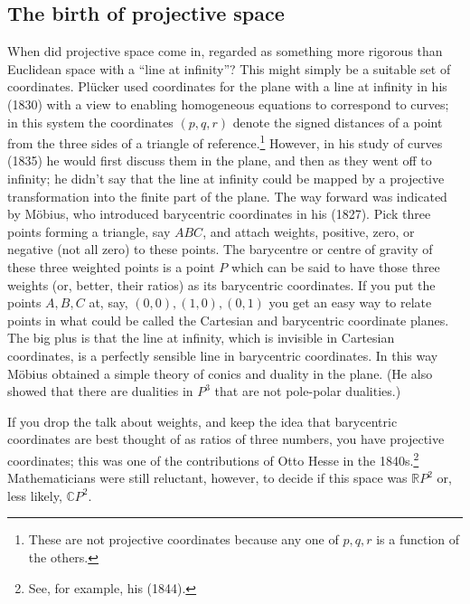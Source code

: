 \documentclass[11pt]{article}
\newcommand{\R}{\mathbb{R}}
\newcommand{\C}{\mathbb{C}}
\begin{document}
\subsection{The birth of projective space}
When did projective space come in, regarded as something more rigorous than Euclidean space with a ``line at infinity''? This might simply be a suitable set of coordinates. Pl\"ucker used coordinates for the plane with a line at infinity in his (1830) with a view to enabling homogeneous equations to correspond to curves; in this system the coordinates $(p, q, r)$ denote the signed distances of a point from the three sides of a triangle of reference.\footnote{These are not projective coordinates because any one of $p, q, r$ is a function of the others.} However, in his study of curves (1835) he would first discuss them in  the plane, and then as they went off to infinity; he didn't say that the line at infinity could be mapped by a projective transformation into the finite part of the plane.  The way forward was indicated by M\"obius, who introduced barycentric coordinates in his (1827). Pick three points forming a triangle, say $ABC$, and attach weights, positive, zero, or negative (not all zero) to these points. The barycentre or centre of gravity of these three weighted points is a point $P$ which can be said to have those three weights (or, better, their ratios) as its barycentric coordinates. If you put the points $A, B, C$ at, say,  $(0, 0), (1, 0), (0, 1)$ you get an easy way to relate points in what could be called the Cartesian and barycentric coordinate planes. The big plus is that the line at infinity, which is invisible in Cartesian coordinates, is a perfectly sensible line in barycentric coordinates. In this way M\"obius obtained a simple theory of conics and duality in the plane. (He also showed that there are dualities in $P^3$ that are not pole-polar dualities.)

If you drop the talk about weights, and keep the idea that barycentric coordinates are best thought of as ratios of three numbers, you have projective coordinates; this was one of the contributions of Otto Hesse in the 1840s.\footnote{See, for example, his (1844).}
Mathematicians were still reluctant, however, to decide if this space was $\R P^2$ or, less likely, $\C P^2$.
 
\end{document}
